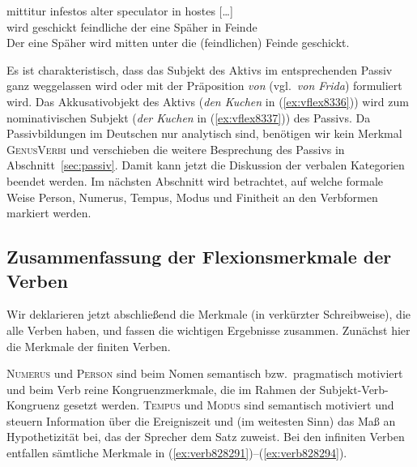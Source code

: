 \begin{exe}
  \ex\label{ex:vflex2349}\gll mittitur infestos alter speculator in hostes [\ldots]\\
  {wird geschickt} {feindliche} {der eine} Späher {in} {Feinde}\\
  \glt Der eine Späher wird mitten unter die (feindlichen) Feinde geschickt.
\end{exe}

Es ist charakteristisch, dass das Subjekt des Aktivs im entsprechenden Passiv ganz weggelassen wird oder mit der Präposition \textit{von} (vgl.\ \textit{von Frida}) formuliert wird.
Das Akkusativobjekt des Aktivs (\textit{den Kuchen} in (\ref{ex:vflex8336})) wird zum nominativischen Subjekt (\textit{der Kuchen} in (\ref{ex:vflex8337})) des Passivs.
Da Passivbildungen im Deutschen nur analytisch sind, benötigen wir kein Merkmal \textsc{GenusVerbi} und verschieben die weitere Besprechung des Passivs in Abschnitt~\ref{sec:passiv}.
Damit kann jetzt die Diskussion der verbalen Kategorien beendet werden.
Im nächsten Abschnitt wird betrachtet, auf welche formale Weise Person, Numerus, Tempus, Modus und Finitheit an den Verbformen markiert werden.

\subsection{Zusammenfassung der Flexionsmerkmale der Verben}

Wir deklarieren jetzt abschließend die Merkmale (in verkürzter Schreibweise), die alle Verben haben, und fassen die wichtigen Ergebnisse zusammen.
Zunächst hier die Merkmale der finiten Verben.

\begin{exe}
\end{exe}

\textsc{Numerus} und \textsc{Person} sind beim Nomen semantisch bzw.\ pragmatisch motiviert und beim Verb reine Kongruenzmerkmale, die im Rahmen der Subjekt-Verb-Kongruenz gesetzt werden.
\textsc{Tempus} und \textsc{Modus} sind semantisch motiviert und steuern Information über die Ereigniszeit und (im weitesten Sinn) das Maß an Hypothetizität bei, das der Sprecher dem Satz zuweist.
Bei den infiniten Verben entfallen sämtliche Merkmale in (\ref{ex:verb828291})--(\ref{ex:verb828294}).

